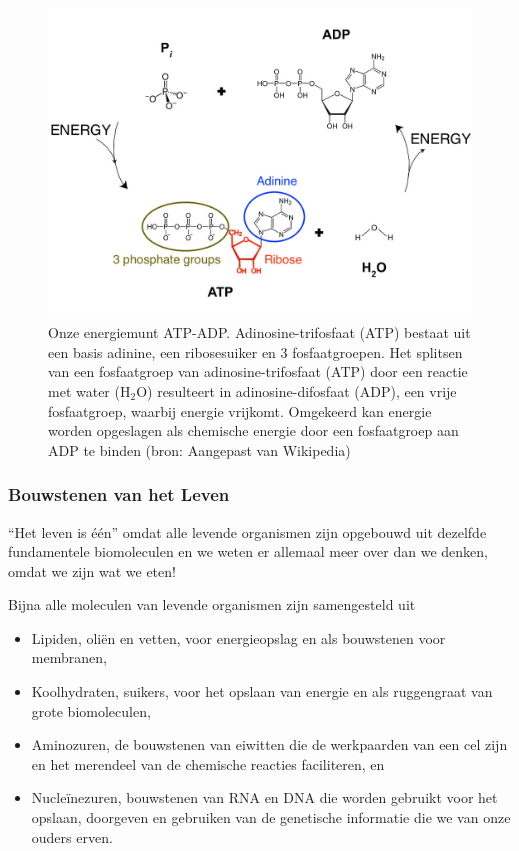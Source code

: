 \documentclass[
  11pt,
]{book}
\providecommand{\tightlist}{%
  \setlength{\itemsep}{0pt}\setlength{\parskip}{0pt}}
\begin{document}
\begin{figure}

{\centering \includegraphics[width=0.7\linewidth]{./figs/ATP-ADP} 

}

\caption{Onze energiemunt ATP-ADP. Adinosine-trifosfaat (ATP) bestaat uit een basis adinine, een ribosesuiker en 3 fosfaatgroepen. Het splitsen van een fosfaatgroep van adinosine-trifosfaat (ATP) door een reactie met water (H\(_2\)O) resulteert in adinosine-difosfaat (ADP), een vrije fosfaatgroep, waarbij energie vrijkomt. Omgekeerd kan energie worden opgeslagen als chemische energie door een fosfaatgroep aan ADP te binden (bron: Aangepast van Wikipedia)}\label{fig:atp-adp}
\end{figure}

\pagebreak

\hypertarget{bouwstenen-van-het-leven}{%
\subsubsection{Bouwstenen van het Leven}\label{bouwstenen-van-het-leven}}

``Het leven is één'' omdat alle levende organismen zijn opgebouwd uit dezelfde fundamentele biomoleculen en we weten er allemaal meer over dan we denken, omdat we zijn wat we eten!

Bijna alle moleculen van levende organismen zijn samengesteld uit

\begin{itemize}
\tightlist
\item
  Lipiden, oliën en vetten, voor energieopslag en als bouwstenen voor membranen,
\item
  Koolhydraten, suikers, voor het opslaan van energie en als ruggengraat van grote biomoleculen,
\item
  Aminozuren, de bouwstenen van eiwitten die de werkpaarden van een cel zijn en het merendeel van de chemische reacties faciliteren, en
\item
  Nucleïnezuren, bouwstenen van RNA en DNA die worden gebruikt voor het opslaan, doorgeven en gebruiken van de genetische informatie die we van onze ouders erven.
\end{itemize}
\end{document}
